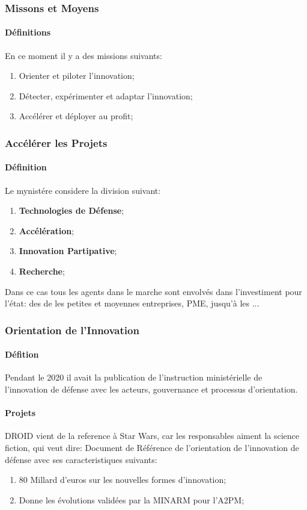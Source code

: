 \documentclass{article}
\begin{document}
\subsubsection{Missons et Moyens}
\paragraph{Définitions}En ce moment il y a des missions suivants:
\begin{enumerate}[noitemsep]
    \item Orienter et piloter l'innovation;
    \item Détecter, expérimenter et adaptar l'innovation;
    \item Accélérer et déployer au profit;
\end{enumerate}

\subsubsection{Accélérer les Projets}
\paragraph{Définition}Le mynistére considere la division suivant:
\begin{enumerate}[noitemsep]
    \item \textbf{Technologies de Défense};
    \item \textbf{Accélération};
    \item \textbf{Innovation Partipative};
    \item \textbf{Recherche};
\end{enumerate}
Dans ce cas tous les agents dans le marche sont envolvés dans l'investiment pour l'état: des de les petites et moyennes entreprises, PME, jusqu'à les ...

\subsubsection{Orientation de l'Innovation}
\paragraph{Défition}Pendant le 2020 il avait la publication de l'instruction ministérielle de l'innovation de défense avec les acteurs, gouvernance et processus d'orientation.

\paragraph{Projets}DROID vient de la reference à Star Wars, car les responsables aiment la science fiction, qui veut dire: Document de Référence de l'orientation de l'innovation de défense avec ses caracteristiques suivants:
\begin{enumerate}[noitemsep]
    \item 80 Millard d'euros sur les nouvelles formes d'innovation;
    \item Donne les évolutions validées par la MINARM pour l'A2PM;
\end{enumerate}
\end{document}
